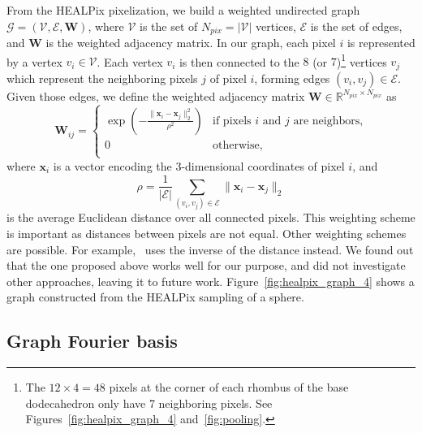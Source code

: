 \documentclass[final,twocolumn,3p,times,sort&compress]{elsarticle}
\newcommand{\figref}[1]{Figure~\ref{fig:#1}}
\renewcommand{\b}[1]{{\bm{#1}}}   %
\newcommand{\1}{\b{1}}              %
\newcommand{\0}{\b{0}}              %
\newcommand{\G}{\mathcal{G}}
\newcommand{\V}{\mathcal{V}}
\newcommand{\E}{\mathcal{E}}
\newcommand{\W}{\b{W}}
\newcommand{\x}{\b{x}}
\newcommand{\R}{\mathbb{R}}
\begin{document}
From the HEALPix pixelization, we build a weighted undirected graph $\G = (\V, \E, \W)$, where $\V$ is the set of $N_{pix} = |\V|$ vertices, $\E$ is the set of edges, and $\W$ is the weighted adjacency matrix.
In our graph, each pixel $i$ is represented by a vertex $v_i \in \V$.
Each vertex $v_i$ is then connected to the $8$ (or $7$)\footnote{\label{neighbors}The $12 \times 4 = 48$ pixels at the corner of each rhombus of the base dodecahedron only have 7 neighboring pixels. See Figures~\ref{fig:healpix_graph_4} and~\ref{fig:pooling}.} vertices $v_j$ which represent the neighboring pixels $j$ of pixel $i$, forming edges $(v_i, v_j) \in \E$. Given those edges, we define the weighted adjacency matrix $\W \in \R^{N_{pix} \times N_{pix}}$ as
\begin{equation*}
	\W_{ij} = \begin{cases}
		\exp \left( -\frac{\|\x_i-\x_j\|_2^2}{\rho^2} \right) & \text{if pixels $i$ and $j$ are neighbors,} \\
		0 & \text{otherwise,} \\
	\end{cases}
\end{equation*}
where $\x_i$ is a vector encoding the 3-dimensional coordinates of pixel $i$, and
\begin{equation*}
	\rho = \frac{1}{|\E|} \sum_{(v_i, v_j) \in \E} \|\x_i-\x_j\|_2
\end{equation*}
is the average Euclidean distance over all connected pixels. This weighting scheme is important as distances between pixels are not equal.
Other weighting schemes are possible. For example,~\cite{khasanova2017graphomni} uses the inverse of the distance instead. We found out that the one proposed above works well for our purpose, and did not investigate other approaches, leaving it to future work.
\figref{healpix_graph_4} shows a graph constructed from the HEALPix sampling of a sphere.


\subsection{Graph Fourier basis}
\end{document}
